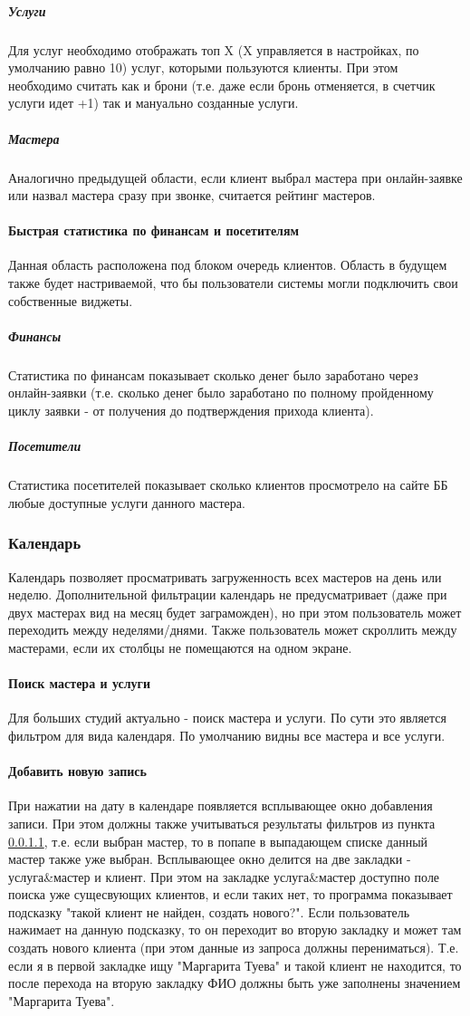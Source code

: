 \documentclass[DIV=calc, paper=a4, fontsize=11pt]{scrartcl} %
\begin{document}
\subparagraph{Услуги}
Для услуг необходимо отображать топ X (X управляется в настройках, по умолчанию равно 10) услуг, которыми пользуются клиенты. При этом необходимо считать как и брони (т.е. даже если бронь отменяется, в счетчик услуги идет +1) так и мануально созданные услуги.

\subparagraph{Мастера}
Аналогично предыдущей области, если клиент выбрал мастера при онлайн-заявке или назвал мастера сразу при звонке, считается рейтинг мастеров.

\paragraph{Быстрая статистика по финансам и посетителям}
Данная область расположена под блоком очередь клиентов. Область в будущем также будет настриваемой, что бы пользователи системы могли подключить свои собственные виджеты.
\subparagraph{Финансы}
Статистика по финансам показывает сколько денег было заработано через онлайн-заявки (т.е. сколько денег было заработано по полному пройденному циклу заявки - от получения до подтверждения прихода клиента).
\subparagraph{Посетители}
Статистика посетителей показывает сколько клиентов просмотрело на сайте ББ любые доступные услуги данного мастера.

\subsubsection{Календарь}
Календарь позволяет просматривать загруженность всех мастеров на день или неделю. Дополнительной фильтрации календарь не предусматривает (даже при двух мастерах вид на месяц будет заграможден), но при этом пользователь может переходить между неделями/днями. Также пользователь может скроллить между мастерами, если их столбцы не помещаются на одном экране.

\paragraph{Поиск мастера и услуги} \label{paragraph:calendar_filter}
Для больших студий актуально - поиск мастера и услуги. По сути это является фильтром для вида календаря. По умолчанию видны все мастера и все услуги.
\paragraph{Добавить новую запись}
При нажатии на дату в календаре появляется всплывающее окно добавления записи. При этом должны также учитываться результаты фильтров из пункта \ref{paragraph:calendar_filter}, т.е. если выбран мастер, то в попапе в выпадающем списке данный мастер также уже выбран. Всплывающее окно делится на две закладки - услуга&мастер и клиент. При этом на закладке услуга&мастер доступно поле поиска уже сущесвующих клиентов, и если таких нет, то программа показывает подсказку "такой клиент не найден, создать нового?". Если пользователь нажимает на данную подсказку, то он переходит во вторую закладку и может там создать нового клиента (при этом данные из запроса должны перениматься). Т.е. если я в первой закладке ищу "Маргарита Туева" и такой клиент не находится, то после перехода на вторую закладку ФИО должны быть уже заполнены значением "Маргарита Туева". 
\end{document}
